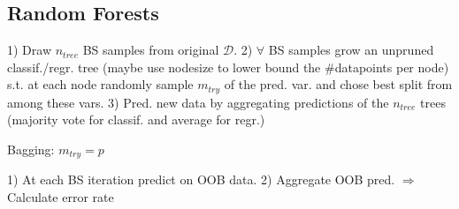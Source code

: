 \vspace{-5pt}

\subsection{Random Forests}
 1) Draw $n_{tree}$ BS samples from original $\mathcal{D}$. 2) $\forall$ BS samples grow an unpruned classif./regr. tree (maybe use nodesize to lower bound the \#datapoints per node) s.t. at each node randomly sample $m_{try}$ of the pred. var. and chose best split from among these vars. 3) Pred. new data by aggregating predictions of the $n_{tree}$ trees (majority vote for classif. and average for regr.)

\vspace{5pt}

 Bagging: $m_{try} = p$

\vspace{5pt}

 1) At each BS iteration predict on OOB data. 2) Aggregate OOB pred. $\Rightarrow$ Calculate error rate
